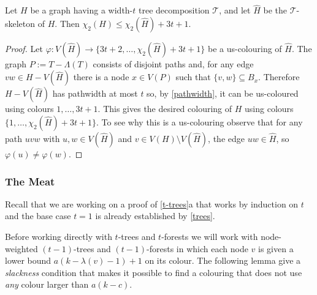\documentclass[kpfonts]{patmorin}
\newcommand{\uqs}{\chi_2}
\theoremstyle{named}
\newcommand{\weirdref}[2]{\cref{#1}#2}
\begin{document}
\begin{lem}\label{skeleton-colour}
    Let $H$ be a graph having a width-$t$ tree decomposition $\mathcal{T}$, and let $\hat{H}$ be the $\mathcal{T}$-skeleton of $H$.  Then $\uqs(H)\le \uqs(\hat{H}) + 3t+1$.
\end{lem}

\begin{proof}
    Let $\varphi:V(\hat{H})\to \{3t+2,\ldots,\uqs(\hat{H})+3t+1\}$ be a us-colouring of $\hat{H}$. The graph $P:=T-\Lambda(T)$ consists of disjoint paths and, for any edge $vw\in H-V(\hat{H})$ there is a node $x\in V(P)$ such that $\{v,w\}\subseteq B_x$.  Therefore $H-V(\hat{H})$ has pathwidth at most $t$ so, by \cref{pathwidth}, it can be us-coloured using colours $1,\ldots,3t+1$.  This gives the desired colouring of $H$ using colours $\{1,\ldots,\uqs(\hat{H})+3t+1\}$.  To see why this is a us-colouring observe that for any path $uvw$ with $u,w\in V(\hat{H})$ and $v\in V(H)\setminus V(\hat{H})$, the edge $uw\in\hat{H}$, so $\varphi(u)\neq\varphi(w)$.
\end{proof}

\subsubsection{The Meat}

Recall that we are working on a proof of \weirdref{t-trees}{a} that works by induction on $t$ and the base case $t=1$ is already established by \cref{trees}.

Before working directly with $t$-trees and $t$-forests we will work with node-weighted $(t-1)$-trees and $(t-1)$-forests in which each node $v$ is given a lower bound $a(k-\lambda(v)-1)+1$ on its colour. The following lemma give a \emph{slackness} condition that makes it possible to find a colouring that does not use \emph{any} colour larger than $a(k-c)$.
\end{document}
